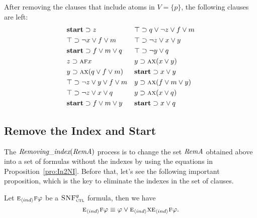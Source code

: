 \documentclass[letterpaper]{article}
\begin{document}
\begin{example}\label{examp:remA}
After removing the clauses that include atoms in $V=\{p\}$, the following clauses are left:
\begin{align*}
& \textbf{start}\supset z &&  \top \supset q \vee \neg z \vee f \vee m \\
& \top \supset \neg x\vee f \vee m &&  \top \supset \neg z \vee x \vee y \\
&  \textbf{start} \supset f\vee m \vee q &&  \top \supset \neg y \vee q\\
&  z \supset \textsc{a} \textsc{f} x &&   y \supset \textsc{a} \textsc{x}(x\vee y) \\
& y \supset \textsc{a}\textsc{x}(q \vee f\vee m)  && \textbf{start} \supset x \vee y \\
& \top \supset \neg z \vee y \vee f \vee m && y \supset \textsc{a}\textsc{x}(f\vee m\vee y)\\
& \top \supset \neg z \vee x \vee q && y \supset \textsc{a}\textsc{x}(x\vee q) \\
&  \textbf{start} \supset f\vee m \vee y && \textbf{start} \supset x \vee q \\
\end{align*}
\end{example}


\subsection{Remove the Index and Start}
The $\emph{Removing\_index}(\emph{RemA})$ process is to change the set $\emph{RemA}$ obtained above into a set of formulas without the indexes by using the equations in Proposition~\ref{pro:In2NI}. Before that, let's see the following important proposition, which is the key to eliminate the indexes in the set of clauses.
\begin{proposition}\label{pro:Ind:EF}
Let $\textsc{e}_{{\langle{ind}\rangle}} \textsc{f} \varphi$ be a ${\textsc{SNF}_{\textsc{ctl}}^g}$ formula, then we have 
\[
\textsc{e}_{{\langle{ind}\rangle}} \textsc{f} \varphi \equiv \varphi \vee \textsc{e}_{{\langle{ind}\rangle}} \textsc{x} \textsc{e}_{{\langle{ind}\rangle}}\textsc{f} \varphi.
\]
\end{proposition}
\end{document}
